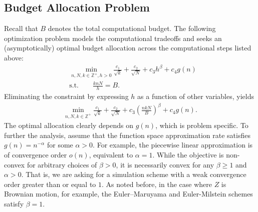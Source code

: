 \documentclass[11pt,leqno]{amsart}
\begin{document}
\subsection{Budget Allocation Problem}
Recall that $B$ denotes the total computational budget. The following optimization problem models the computational tradeoffs and seeks an (asymptotically) optimal budget allocation across the computational steps listed above:%
\begin{align*}
&\min_{n, N, k\in \mathbb{Z}^+, h>0} \frac{c_1}{\sqrt{k}} + \frac{c_2}{\sqrt{N}} + c_3h^{\beta} + {c_4 } g(n)\\
&\text{s.t.}\qquad\frac{knN}{h}=B.
\end{align*}
Eliminating the constraint by expressing $h$ as a function of other variables, yields
\begin{align*}
\min_{n, N, k\in \mathbb{Z}^+} \frac{c_1}{\sqrt{k}} + \frac{c_2}{\sqrt{N}} + c_3\left(\frac{nkN}{B}\right)^{\beta} + {c_4} g(n).
\end{align*}
The optimal allocation clearly depends on $g(n)$, which is problem specific. To further the analysis, assume that the function space approximation rate satisfies $g(n)={n^{-\alpha}}$ for some $\alpha>0$. For example, the piecewise linear approximation is of convergence order $o(n)$, equivalent to $\alpha=1$. While the objective is non-convex for arbitrary choices of $\beta >0$, it is necessarily convex for any $\beta\geq 1$ and $\alpha >0$. That is, we are asking for a simulation scheme with a weak convergence order greater than or equal to $1$. As noted before, in the case where $Z$ is Brownian motion, for example, the Euler–Maruyama and Euler-Milstein schemes satisfy $\beta = 1$.  
\end{document}
